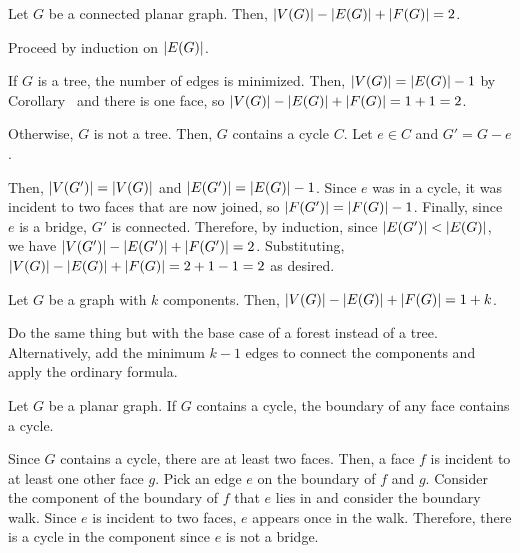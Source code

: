 \begin{theorem}\label{thm:euler}
  Let $G$ be a connected planar graph.
  Then, $\abs{V(G)} - \abs{E(G)} + \abs{F(G)} = 2$.
\end{theorem}
\begin{prf}
  Proceed by induction on $\abs{E(G)}$.

  If $G$ is a tree, the number of edges is minimized.
  Then, $\abs{V(G)} = \abs{E(G)} - 1$ by Corollary~
  and there is one face, so $\abs{V(G)} - \abs{E(G)} + \abs{F(G)} = 1 + 1 = 2$.

  Otherwise, $G$ is not a tree.
  Then, $G$ contains a cycle $C$.
  Let $e \in C$ and $G' = G - e$.

  Then, $\abs{V(G')} = \abs{V(G)}$ and $\abs{E(G')} = \abs{E(G)} - 1$.
  Since $e$ was in a cycle, it was incident to two faces that are now joined,
  so $\abs{F(G')} = \abs{F(G)} - 1$.
  Finally, since $e$ is a bridge, $G'$ is connected.
  Therefore, by induction, since $\abs{E(G')} < \abs{E(G)}$,
  we have $\abs{V(G')} - \abs{E(G')} + \abs{F(G')} = 2$.
  Substituting, $\abs{V(G)} - \abs{E(G)} + \abs{F(G)} = 2 + 1 - 1 = 2$ as desired.
\end{prf}

\begin{corollary}\label{cor:euler}
  Let $G$ be a graph with $k$ components.
  Then, $\abs{V(G)} - \abs{E(G)} + \abs{F(G)} = 1 + k$.
\end{corollary}
\begin{prf}
  Do the same thing but with the base case of a forest instead of a tree.
  Alternatively, add the minimum $k-1$ edges to connect the components
  and apply the ordinary formula.
\end{prf}

\begin{lemma}[7.5.1]\label{lem:751}
  Let $G$ be a planar graph. If $G$ contains a cycle,
  the boundary of any face contains a cycle.
\end{lemma}
\begin{prf}
  Since $G$ contains a cycle, there are at least two faces.
  Then, a face $f$ is incident to at least one other face $g$.
  Pick an edge $e$ on the boundary of $f$ and $g$.
  Consider the component of the boundary of $f$ that $e$ lies in
  and consider the boundary walk.
  Since $e$ is incident to two faces, $e$ appears once in the walk.
  Therefore, there is a cycle in the component since $e$ is not a bridge.
\end{prf}

